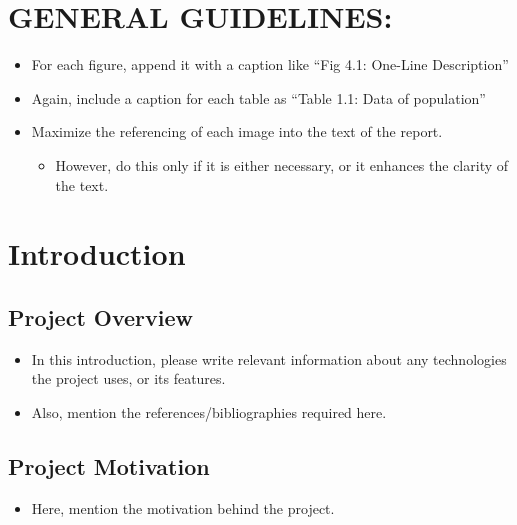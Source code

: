 \documentclass[
  12pt,
  a4paper,
  option1,
  option2]{book}
\author{}
\date{}
\providecommand{\tightlist}{%
  \setlength{\itemsep}{0pt}\setlength{\parskip}{0pt}}
\begin{document}
\frontmatter

\renewcommand*\contentsname{Table of Contents}
{
\hypersetup{linkcolor=blue}
\setcounter{tocdepth}{2}
\tableofcontents
}
\listoffigures
\listoftables
{}
\mainmatter
\chapter{GENERAL GUIDELINES:}\label{general-guidelines}

\begin{itemize}
\tightlist
\item
  For each figure, append it with a caption like ``Fig 4.1: One-Line
  Description''
\item
  Again, include a caption for each table as ``Table 1.1: Data of
  population''
\item
  Maximize the referencing of each image into the text of the report.

  \begin{itemize}
  \tightlist
  \item
    However, do this only if it is either necessary, or it enhances the
    clarity of the text.
  \end{itemize}
\end{itemize}

\chapter{Introduction}\label{sec:Intro}

\section{Project Overview}\label{sec:IntroOverview}

\begin{itemize}
\item
  In this introduction, please write relevant information about any
  technologies the project uses, or its features.
\item
  Also, mention the references/bibliographies required here.
\end{itemize}

\section{Project Motivation}\label{sec:IntroMotive}

\begin{itemize}
\tightlist
\item
  Here, mention the motivation behind the project.
\end{itemize}
\end{document}
